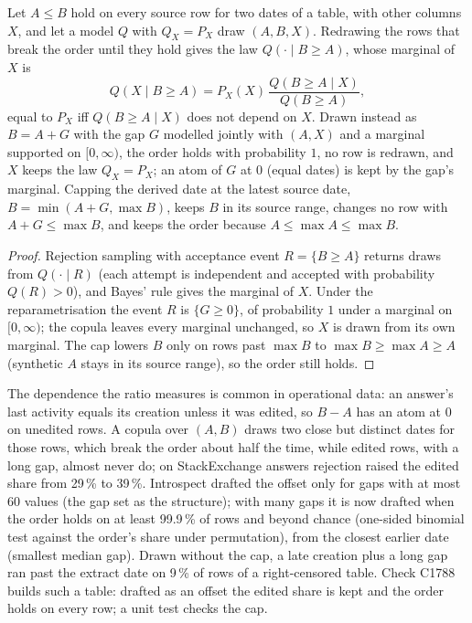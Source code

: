 \begin{proposition}\label{prop:ordergap}
Let $A\le B$ hold on every source row for two dates of a table, with other columns $X$, and let a model $Q$ with $Q_X=P_X$ draw $(A,B,X)$. Redrawing the rows that break the order until they hold gives the law $Q(\cdot\mid B\ge A)$, whose marginal of $X$ is
$$Q(X\mid B\ge A)=P_X(X)\,\frac{Q(B\ge A\mid X)}{Q(B\ge A)},$$
equal to $P_X$ iff $Q(B\ge A\mid X)$ does not depend on $X$. Drawn instead as $B=A+G$ with the gap $G$ modelled jointly with $(A,X)$ and a marginal supported on $[0,\infty)$, the order holds with probability $1$, no row is redrawn, and $X$ keeps the law $Q_X=P_X$; an atom of $G$ at $0$ (equal dates) is kept by the gap's marginal. Capping the derived date at the latest source date, $B=\min(A+G,\max B)$, keeps $B$ in its source range, changes no row with $A+G\le\max B$, and keeps the order because $A\le\max A\le\max B$.
\end{proposition}
\begin{proof}
Rejection sampling with acceptance event $R=\{B\ge A\}$ returns draws from $Q(\cdot\mid R)$ (each attempt is independent and accepted with probability $Q(R)>0$), and Bayes' rule gives the marginal of $X$. Under the reparametrisation the event $R$ is $\{G\ge0\}$, of probability $1$ under a marginal on $[0,\infty)$; the copula leaves every marginal unchanged, so $X$ is drawn from its own marginal. The cap lowers $B$ only on rows past $\max B$ to $\max B\ge\max A\ge A$ (synthetic $A$ stays in its source range), so the order still holds.
\end{proof}
\noindent The dependence the ratio measures is common in operational data: an answer's last activity equals its creation unless it was edited, so $B-A$ has an atom at $0$ on unedited rows. A copula over $(A,B)$ draws two close but distinct dates for those rows, which break the order about half the time, while edited rows, with a long gap, almost never do; on StackExchange answers rejection raised the edited share from 29\,\% to 39\,\%. Introspect drafted the offset only for gaps with at most 60 values (the gap set as the structure); with many gaps it is now drafted when the order holds on at least 99.9\,\% of rows and beyond chance (one-sided binomial test against the order's share under permutation), from the closest earlier date (smallest median gap). Drawn without the cap, a late creation plus a long gap ran past the extract date on 9\,\% of rows of a right-censored table. Check C1788 builds such a table: drafted as an offset the edited share is kept and the order holds on every row; a unit test checks the cap.

\setcounter{proposition}{\value{savedpropgfour}}
